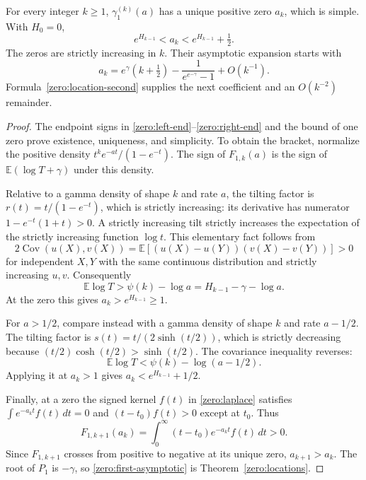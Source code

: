 \begin{theorem}\label{zero:first}
For every integer $k\geq1$, $\gamma_1^{(k)}(a)$ has a unique positive
zero $a_k$, which is simple.  With $H_0=0$,
\begin{equation}\label{zero:half-unit}
 e^{H_{k-1}}<a_k<e^{H_{k-1}}+\tfrac12.
\end{equation}
The zeros are strictly increasing in $k$.  Their asymptotic expansion
starts with
\begin{equation}\label{zero:first-asymptotic}
 a_k=e^\gamma\left(k+\tfrac12\right)
                     -\frac1{e^{e^{-\gamma}}-1}+O(k^{-1}).
\end{equation}
Formula~\eqref{zero:location-second} supplies the next coefficient
and an $O(k^{-2})$ remainder.
\end{theorem}
\begin{proof}
The endpoint signs in \eqref{zero:left-end}--\eqref{zero:right-end}
and the bound of one zero prove existence, uniqueness, and simplicity.
To obtain the bracket, normalize the positive density
$t^k e^{-at}/(1-e^{-t})$.  The sign of $F_{1,k}(a)$ is the sign of
$\mathbb E(\log T+\gamma)$ under this density.

Relative to a gamma density of shape $k$ and rate $a$, the tilting
factor is
$r(t)=t/(1-e^{-t})$, which is strictly increasing: its derivative has
numerator $1-e^{-t}(1+t)>0$.  A strictly increasing tilt strictly
increases the expectation of the strictly increasing function
$\log t$.  This elementary fact follows from
\[
 2\operatorname{Cov}(u(X),v(X))
   =\mathbb E[(u(X)-u(Y))(v(X)-v(Y))]>0
\]
for independent $X,Y$ with the same continuous distribution and
strictly increasing $u,v$.  Consequently
\[
 \mathbb E\log T>\psi(k)-\log a
                 =H_{k-1}-\gamma-\log a.
\]
At the zero this gives $a_k>e^{H_{k-1}}\geq1$.

For $a>1/2$, compare instead with a gamma density of shape $k$
and rate $a-1/2$.  The tilting factor is
$s(t)=t/(2\sinh(t/2))$, which is strictly decreasing because
$(t/2)\cosh(t/2)>\sinh(t/2)$.  The covariance inequality reverses:
\[
 \mathbb E\log T<\psi(k)-\log(a-1/2).
\]
Applying it at $a_k>1$ gives $a_k<e^{H_{k-1}}+1/2$.

Finally, at a zero the signed kernel $f(t)$ in
\eqref{zero:laplace} satisfies $\int e^{-a_kt}f(t)\,dt=0$ and
$(t-t_0)f(t)>0$ except at $t_0$.  Thus
\[
 F_{1,k+1}(a_k)=\int_0^\infty (t-t_0)e^{-a_kt}f(t)\,dt>0.
\]
Since $F_{1,k+1}$ crosses from positive to negative at its unique
zero, $a_{k+1}>a_k$.  The root of $P_1$ is $-\gamma$, so
\eqref{zero:first-asymptotic} is Theorem~\ref{zero:locations}.
\end{proof}

